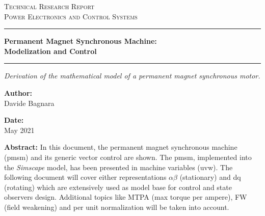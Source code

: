 \documentclass[12pt,a4paper]{scrartcl}
\newcommand{\DocCategory}{Technical Research Report}
\newcommand{\DocField}{Power Electronics and Control Systems}
\newcommand{\DocTitle}{%
	Permanent Magnet Synchronous Machine: \\[12pt]
	Modelization and Control
}
\newcommand{\DocSubtitle}{%
	Derivation of the mathematical model of a permanent magnet synchronous motor. 
}
\newcommand{\DocAuthor}{Davide Bagnara}
\newcommand{\DocDate}{May 2021}
\newcommand{\DocAbstract}{%
	In this document, the permanent magnet synchronous machine (pmsm) and its generic vector control are shown. The pmsm, implemented into the \textit{Simscape} model, has been presented in machine variables (uvw). The following document will cover either representations $\alpha\beta$ (stationary) and dq (rotating) which are extensively used as model base for control and state observers design. Additional topics like MTPA (max torque per ampere), FW (field weakening) and per unit normalization will be taken into account. 
}
\begin{document}
\titlepage
\begin{center}
	{\Large\scshape \DocCategory}\\[8pt]
	{\large\scshape \DocField}
\end{center}

\vspace{36pt}
\noindent\rule{\linewidth}{0.8pt}

\begin{center}
	{\fontsize{30}{30}\selectfont\bfseries \DocTitle}
\end{center}

\vspace{4pt}
\noindent\rule{\linewidth}{2.2pt}

\begin{center}
	\begin{onehalfspace}
		{\large\itshape \DocSubtitle}
	\end{onehalfspace}
\end{center}

\vspace{36pt}

\begin{minipage}{0.92\linewidth}
	\noindent
	\begin{minipage}[t]{0.48\linewidth}
		\textbf{Author:}\\[2pt]
		\DocAuthor
	\end{minipage}%
	\hfill
	\begin{minipage}[t]{0.48\linewidth}
		\raggedleft
		\textbf{Date:}\\[2pt]
		\DocDate
	\end{minipage}
\end{minipage}
\vspace{36pt}

\begin{center}
	\begin{minipage}{0.85\linewidth}
		\footnotesize 
		\begin{onehalfspace}
			\textbf{Abstract:} \DocAbstract
		\end{onehalfspace}
	\end{minipage}
\end{center}
\end{document}
